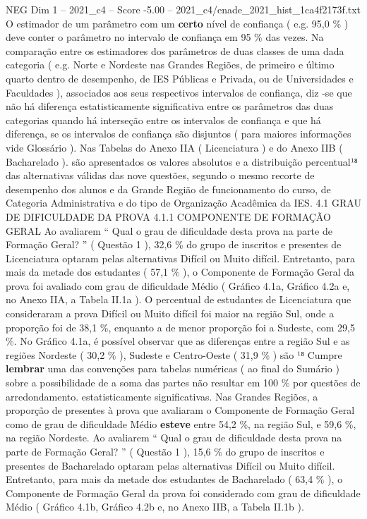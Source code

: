 \begin{textsample}{NEG Dim 1 – 2021\_c4 – Score -5.00 – 2021\_c4/enade\_2021\_hist\_1ca4f2173f.txt}
O estimador de um parâmetro com um \textbf{certo} nível de confiança ( e.g. 95,0 \% ) deve conter o parâmetro no intervalo de confiança em 95 \% das vezes.
Na comparação entre os estimadores dos parâmetros de duas classes de uma dada categoria ( e.g.
Norte e Nordeste nas Grandes Regiões, de primeiro e último quarto dentro de desempenho, de IES Públicas e Privada, ou de Universidades e Faculdades ), associados aos seus respectivos intervalos de confiança, diz -se que não há diferença estatisticamente significativa entre os parâmetros das duas categorias quando há interseção entre os intervalos de confiança e que há diferença, se os intervalos de confiança são disjuntos ( para maiores informações vide Glossário ).
Nas Tabelas do Anexo IIA ( Licenciatura ) e do Anexo IIB ( Bacharelado ). são apresentados os valores absolutos e a distribuição percentual¹⁸ das alternativas válidas das nove questões, segundo o mesmo recorte de desempenho dos alunos e da Grande Região de funcionamento do curso, de Categoria Administrativa e do tipo de Organização Acadêmica da IES. 4.1 GRAU DE DIFICULDADE DA PROVA 4.1.1 COMPONENTE DE FORMAÇÃO GERAL Ao avaliarem “ Qual o grau de dificuldade desta prova na parte de Formação Geral? ” ( Questão 1 ), 32,6 \% do grupo de inscritos e presentes de Licenciatura optaram pelas alternativas Difícil ou Muito difícil.
Entretanto, para mais da metade dos estudantes ( 57,1 \% ), o Componente de Formação Geral da prova foi avaliado com grau de dificuldade Médio ( Gráfico 4.1a, Gráfico 4.2a e, no Anexo IIA, a Tabela II.1a ).
O percentual de estudantes de Licenciatura que consideraram a prova Difícil ou Muito difícil foi maior na região Sul, onde a proporção foi de 38,1 \%, enquanto a de menor proporção foi a Sudeste, com 29,5 \%.
No Gráfico 4.1a, é possível observar que as diferenças entre a região Sul e as regiões Nordeste ( 30,2 \% ), Sudeste e Centro-Oeste ( 31,9 \% ) são ¹⁸ Cumpre \textbf{lembrar} uma das convenções para tabelas numéricas ( ao final do Sumário ) sobre a possibilidade de a soma das partes não resultar em 100 \% por questões de arredondamento. estatisticamente significativas.
Nas Grandes Regiões, a proporção de presentes à prova que avaliaram o Componente de Formação Geral como de grau de dificuldade Médio \textbf{esteve} entre 54,2 \%, na região Sul, e 59,6 \%, na região Nordeste.
Ao avaliarem “ Qual o grau de dificuldade desta prova na parte de Formação Geral? ” ( Questão 1 ), 15,6 \% do grupo de inscritos e presentes de Bacharelado optaram pelas alternativas Difícil ou Muito difícil.
Entretanto, para mais da metade dos estudantes de Bacharelado ( 63,4 \% ), o Componente de Formação Geral da prova foi considerado com grau de dificuldade Médio ( Gráfico 4.1b, Gráfico 4.2b e, no Anexo IIB, a Tabela II.1b ).

\end{textsample}
